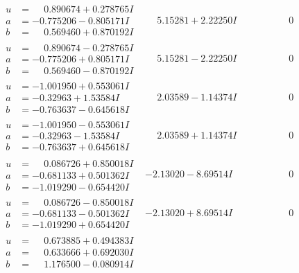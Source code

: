 \documentclass[1p]{elsarticle_modified}
\theoremstyle{definition}
\begin{document}
$$\begin{array}{c|c|c}
\begin{aligned}
u &= \phantom{-}0.890674 + 0.278765 I \\
a &= -0.775206 - 0.805171 I \\
b &= \phantom{-}0.569460 + 0.870192 I\end{aligned}
 & \phantom{-}5.15281 + 2.22250 I & \phantom{-0.000000 } 0 \\ \hline\begin{aligned}
u &= \phantom{-}0.890674 - 0.278765 I \\
a &= -0.775206 + 0.805171 I \\
b &= \phantom{-}0.569460 - 0.870192 I\end{aligned}
 & \phantom{-}5.15281 - 2.22250 I & \phantom{-0.000000 } 0 \\ \hline\begin{aligned}
u &= -1.001950 + 0.553061 I \\
a &= -0.32963 + 1.53584 I \\
b &= -0.763637 - 0.645618 I\end{aligned}
 & \phantom{-}2.03589 - 1.14374 I & \phantom{-0.000000 } 0 \\ \hline\begin{aligned}
u &= -1.001950 - 0.553061 I \\
a &= -0.32963 - 1.53584 I \\
b &= -0.763637 + 0.645618 I\end{aligned}
 & \phantom{-}2.03589 + 1.14374 I & \phantom{-0.000000 } 0 \\ \hline\begin{aligned}
u &= \phantom{-}0.086726 + 0.850018 I \\
a &= -0.681133 + 0.501362 I \\
b &= -1.019290 - 0.654420 I\end{aligned}
 & -2.13020 - 8.69514 I & \phantom{-0.000000 } 0 \\ \hline\begin{aligned}
u &= \phantom{-}0.086726 - 0.850018 I \\
a &= -0.681133 - 0.501362 I \\
b &= -1.019290 + 0.654420 I\end{aligned}
 & -2.13020 + 8.69514 I & \phantom{-0.000000 } 0 \\ \hline\begin{aligned}
u &= \phantom{-}0.673885 + 0.494383 I \\
a &= \phantom{-}0.633666 + 0.692030 I \\
b &= \phantom{-}1.176500 - 0.080914 I\end{aligned}

\end{array}$$
\end{document}
